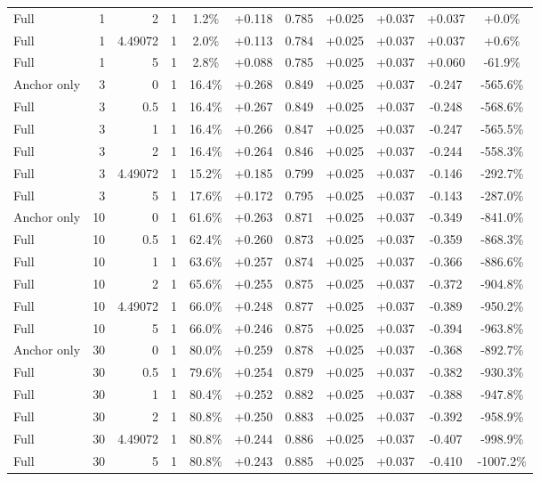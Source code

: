 \begin{table}[htbp]
\begin{tabular}{lrrrccccccc}
Full & 1 & 2 & 1 & 1.2\% & +0.118 & 0.785 & +0.025 & +0.037 & +0.037 & +0.0\% \\
Full & 1 & 4.49072 & 1 & 2.0\% & +0.113 & 0.784 & +0.025 & +0.037 & +0.037 & +0.6\% \\
Full & 1 & 5 & 1 & 2.8\% & +0.088 & 0.785 & +0.025 & +0.037 & +0.060 & -61.9\% \\
Anchor only & 3 & 0 & 1 & 16.4\% & +0.268 & 0.849 & +0.025 & +0.037 & -0.247 & -565.6\% \\
Full & 3 & 0.5 & 1 & 16.4\% & +0.267 & 0.849 & +0.025 & +0.037 & -0.248 & -568.6\% \\
Full & 3 & 1 & 1 & 16.4\% & +0.266 & 0.847 & +0.025 & +0.037 & -0.247 & -565.5\% \\
Full & 3 & 2 & 1 & 16.4\% & +0.264 & 0.846 & +0.025 & +0.037 & -0.244 & -558.3\% \\
Full & 3 & 4.49072 & 1 & 15.2\% & +0.185 & 0.799 & +0.025 & +0.037 & -0.146 & -292.7\% \\
Full & 3 & 5 & 1 & 17.6\% & +0.172 & 0.795 & +0.025 & +0.037 & -0.143 & -287.0\% \\
Anchor only & 10 & 0 & 1 & 61.6\% & +0.263 & 0.871 & +0.025 & +0.037 & -0.349 & -841.0\% \\
Full & 10 & 0.5 & 1 & 62.4\% & +0.260 & 0.873 & +0.025 & +0.037 & -0.359 & -868.3\% \\
Full & 10 & 1 & 1 & 63.6\% & +0.257 & 0.874 & +0.025 & +0.037 & -0.366 & -886.6\% \\
Full & 10 & 2 & 1 & 65.6\% & +0.255 & 0.875 & +0.025 & +0.037 & -0.372 & -904.8\% \\
Full & 10 & 4.49072 & 1 & 66.0\% & +0.248 & 0.877 & +0.025 & +0.037 & -0.389 & -950.2\% \\
Full & 10 & 5 & 1 & 66.0\% & +0.246 & 0.875 & +0.025 & +0.037 & -0.394 & -963.8\% \\
Anchor only & 30 & 0 & 1 & 80.0\% & +0.259 & 0.878 & +0.025 & +0.037 & -0.368 & -892.7\% \\
Full & 30 & 0.5 & 1 & 79.6\% & +0.254 & 0.879 & +0.025 & +0.037 & -0.382 & -930.3\% \\
Full & 30 & 1 & 1 & 80.4\% & +0.252 & 0.882 & +0.025 & +0.037 & -0.388 & -947.8\% \\
Full & 30 & 2 & 1 & 80.8\% & +0.250 & 0.883 & +0.025 & +0.037 & -0.392 & -958.9\% \\
Full & 30 & 4.49072 & 1 & 80.8\% & +0.244 & 0.886 & +0.025 & +0.037 & -0.407 & -998.9\% \\
Full & 30 & 5 & 1 & 80.8\% & +0.243 & 0.885 & +0.025 & +0.037 & -0.410 & -1007.2\% \\

\end{tabular}
\end{table}

